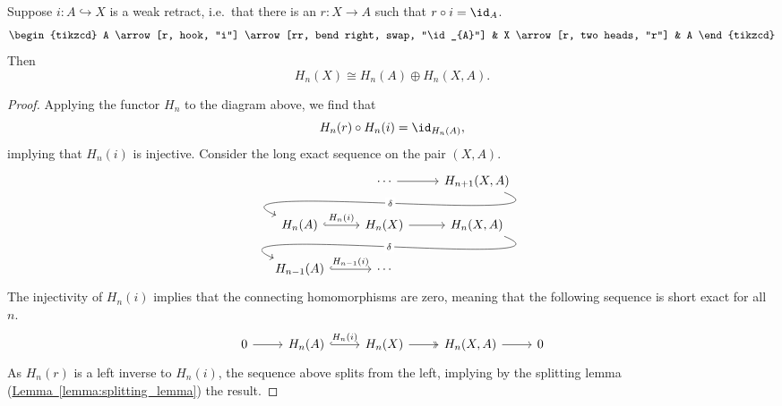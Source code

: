 \documentclass[main.tex]{subfiles}
\begin{document}
\begin{proposition}
  Suppose $i\colon A \hookrightarrow X$ is a weak retract, i.e.\ that there is an $r\colon X \to A$ such that $r \circ i = \id_{A}$.
  \begin{equation*}
    \begin{tikzcd}
      A
      \arrow[r, hook, "i"]
      \arrow[rr, bend right, swap, "\id_{A}"]
      & X
      \arrow[r, two heads, "r"]
      & A
    \end{tikzcd}
  \end{equation*}
  Then
  \begin{equation*}
    H_{n}(X) \cong H_{n}(A) \oplus H_{n}(X, A).
  \end{equation*}
\end{proposition}
\begin{proof}
  Applying the functor $H_{n}$ to the diagram above, we find that
  \begin{equation*}
    H_{n}(r) \circ H_{n}(i) = \id_{H_{n}(A)},
  \end{equation*}
  implying that $H_{n}(i)$ is injective. Consider the long exact sequence on the pair $(X, A)$.
  \begin{equation*}
    \begin{tikzcd}
      & \cdots
      \arrow[r]
      & H_{n+1}(X, A)
      \\
      H_{n}(A)
      \arrow[from=urr, out=-22, in=157, looseness=1, overlay, "\delta" description]
      \arrow[r, hookrightarrow, "H_{n}(i)"]
      & H_{n}(X)
      \arrow[r,]
      & H_{n}(X, A)
      \\
      H_{n-1}(A)
      \arrow[r, hookrightarrow, "H_{n-1}(i)"]
      \arrow[from=urr, out=-22, in=157, looseness=1, overlay, "\delta" description]
      & \cdots
    \end{tikzcd}
  \end{equation*}
  The injectivity of $H_{n}(i)$ implies that the connecting homomorphisms are zero, meaning that the following sequence is short exact for all $n$.
  \begin{equation*}
    \begin{tikzcd}
      0
      \arrow[r]
      & H_{n}(A)
      \arrow[r, hook, "H_{n}(i)"]
      & H_{n}(X)
      \arrow[r, two heads]
      & H_{n}(X, A)
      \arrow[r]
      & 0
    \end{tikzcd}
  \end{equation*}
  As $H_{n}(r)$ is a left inverse to $H_{n}(i)$, the sequence above splits from the left, implying by the splitting lemma (\hyperref[lemma:splitting_lemma]{Lemma~\ref*{lemma:splitting_lemma}}) the result.
\end{proof}
\end{document}

